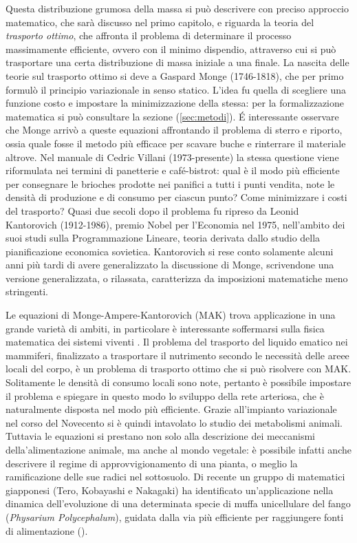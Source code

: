 Questa distribuzione grumosa della massa si può descrivere con preciso approccio matematico, che sarà discusso nel primo capitolo,
e riguarda la teoria del \textit{trasporto ottimo}, che affronta il problema di determinare il processo massimamente
efficiente, ovvero con il minimo dispendio, attraverso cui si può trasportare una certa distribuzione di massa iniziale a una 
finale. La nascita delle teorie sul trasporto ottimo si deve a Gaspard Monge (1746-1818), che per primo formulò il principio
variazionale in senso statico. L'idea fu quella di scegliere una funzione costo e impostare la minimizzazione della stessa: 
per la formalizzazione matematica si può consultare la sezione (\ref{sec:metodi}). \'E interessante osservare che Monge 
arrivò a queste equazioni affrontando il problema di sterro e riporto, ossia quale fosse il metodo più efficace per scavare buche
e rinterrare il materiale altrove. Nel manuale di Cedric Villani (1973-presente) la stessa questione viene riformulata nei termini
di panetterie e café-bistrot: qual è il modo più efficiente per consegnare le brioches prodotte nei panifici a tutti i punti vendita,
note le densità di produzione e di consumo per ciascun punto? Come minimizzare i costi del trasporto?
Quasi due secoli dopo il problema fu ripreso da Leonid Kantorovich (1912-1986), premio Nobel per l'Economia nel 1975, nell'ambito 
dei suoi studi sulla Programmazione Lineare, teoria derivata dallo studio della pianificazione economica sovietica. Kantorovich si
rese conto solamente alcuni anni più tardi di avere generalizzato la discussione di Monge, scrivendone una versione generalizzata,
o rilassata, caratterizza da imposizioni matematiche meno stringenti.

Le equazioni di Monge-Ampere-Kantorovich (MAK) trova applicazione in una grande varietà di ambiti, in particolare è interessante 
soffermarsi sulla fisica matematica dei sistemi viventi \cite{cardin}. Il problema del trasporto del liquido ematico nei mammiferi,
finalizzato a trasportare il nutrimento secondo le necessità delle areee locali del corpo, è un problema di trasporto
ottimo che si può risolvere con MAK. Solitamente le densità di consumo locali sono note, pertanto è possibile impostare
il problema e spiegare in questo modo lo sviluppo della rete arteriosa, che è naturalmente disposta nel modo più efficiente.
Grazie all'impianto variazionale nel corso del Novecento si è quindi intavolato lo studio dei metabolismi animali.
Tuttavia le equazioni si prestano non solo alla descrizione dei meccanismi della'alimentazione animale, ma anche al
mondo vegetale: è possibile infatti anche descrivere il regime di approvvigionamento di una pianta, o meglio 
la ramificazione delle sue radici nel sottosuolo.
Di recente un gruppo di matematici giapponesi (Tero, Kobayashi e Nakagaki) ha identificato un'applicazione nella
dinamica dell'evoluzione di una determinata specie di muffa unicellulare del fango (\textit{Physarium Polycephalum}),
guidata dalla via più efficiente per raggiungere fonti di alimentazione (\cite{yamada}).

